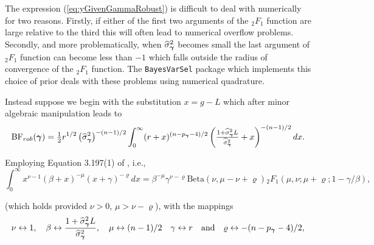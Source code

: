 The expression (\ref{eq:yGivenGammaRobust}) is difficult to deal with numerically for two reasons. Firstly, if either of the first 
two arguments of the ${}_2F_1$ function are large relative to the third this will often lead to numerical overflow problems. Secondly,
and more problematically, when $\widehat{\sigma}_{\boldsymbol \gamma}^2$ becomes small the last argument
of ${}_2F_1$ function can become less than $-1$ which falls outside the radius of convergence
of the ${}_2F_1$ function. The {\tt BayesVarSel} package which implements
this choice of prior deals with these problems using numerical
quadrature.

Instead suppose we begin with the substitution $x = g - L$ which after minor algebraic manipulation
leads to
$$
\displaystyle \mbox{BF}_{{rob}}({\boldsymbol \gamma})
= \tfrac{1}{2} r^{1/2} \left( \widehat{\sigma}_{\boldsymbol \gamma}^2\right)^{-(n-1)/2} 
\int_0^\infty  (r + x)^{(n - p_{\boldsymbol \gamma}-4)/2}
\left(  \tfrac{1 +  \widehat{\sigma}_{\boldsymbol \gamma}^2L}{\widehat{\sigma}_{\boldsymbol \gamma}^2} +  x \right)^{-(n-1)/2} dx.
$$

\noindent Employing Equation 3.197(1) of \cite{Gradshteyn2007}, i.e.,
$$
\int_0^\infty x^{\nu - 1}(\beta + x)^{-\mu}(x + \gamma)^{-\varrho} dx
= \beta^{-\mu}
\gamma^{\nu - \varrho} 
\mbox{Beta}(\nu,\mu - \nu + \varrho)
{}_2F_1(\mu,\nu;\mu+\varrho; 1 - \gamma/\beta),
$$

\noindent (which holds provided $\nu>0$, $\mu > \nu - \varrho$), with the mappings
$$
\nu \leftrightarrow 1,
\quad 
\beta \leftrightarrow \frac{1 +  \widehat{\sigma}_{\boldsymbol \gamma}^2L}{\widehat{\sigma}_{\boldsymbol \gamma}^2},
\quad 
\mu \leftrightarrow (n-1)/2
\quad 
\gamma \leftrightarrow r
\quad \mbox{and} \quad 
\varrho \leftrightarrow -(n - p_{\boldsymbol \gamma}-4)/2,
$$

